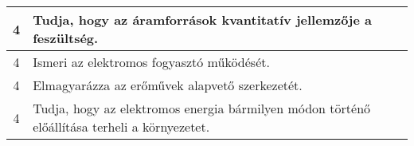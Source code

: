 \begin{longtable}{c | p{12cm} }
                                          4 &  Tudja, hogy az áramforrások kvantitatív jellemzője a feszültség. \\ \hline
                                          4 &  Ismeri az elektromos fogyasztó működését. \\ \hline
                                          4 &  Elmagyarázza az erőművek alapvető szerkezetét. \\ \hline
                                          4 &  Tudja, hogy az elektromos energia bármilyen módon történő előállítása terheli a környezetet. \\ \hline
                                      
                        \end{longtable}
            \clearpage

       
